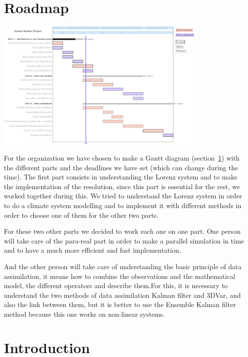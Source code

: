 \documentclass[12pt]{article}
\begin{document}
	\nocite{*}
	
	
	
	\tableofcontents
	
    \newpage
	\section{Roadmap}
	    \label{diag}
	    
	    \includegraphics[angle=90,width=0.78\textwidth]{gantt.pdf}
	
	
	\noindent For the organization we have chosen to make a Gantt diagram (section~\ref{diag}) with the different parts and the deadlines we have set (which can change during the time). The first part consists in understanding the Lorenz system and to make the implementation of the resolution, since this part is essential for the rest, we worked together during this.
	We tried to understand the Lorenz system in order to do a climate system modelling and to implement it with different methods in order to choose one of them for the other two parts. 
	
	
	\noindent For these two other parts we decided to work each one on one part. One person will take care of the para-real part in order to make a parallel simulation in time and to have a much more efficient and fast implementation.
	
	
    \noindent And the other person will take care of understanding the basic principle of data assimilation, it means how to combine the observations and the mathematical model, the different operators and describe them.For this, it is necessary to understand the two methods of data assimilation Kalman filter and 3DVar, and also the link between them, but it is better to use the Ensemble Kalman filter method because this one works on non-linear systems.


	\section{Introduction}
	
\end{document}
